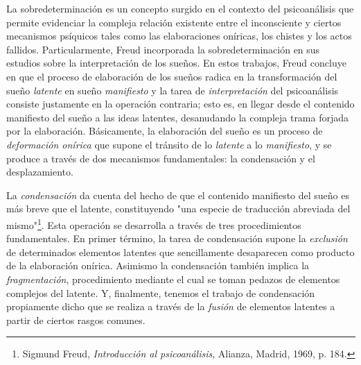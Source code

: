 \documentclass{book}
\begin{document}
La sobredeterminación es un concepto surgido en el contexto del
psicoanálisis que permite evidenciar la compleja relación existente
entre el inconsciente y ciertos mecanismos psíquicos tales como las
elaboraciones oníricas, los chistes y los actos fallidos.
Particularmente, Freud incorporada la sobredeterminación en sus estudios
sobre la interpretación de los sueños. En estos trabajos, Freud concluye
en que el proceso de elaboración de los sueños radica en la
transformación del sueño \emph{latente} en sueño \emph{manifiesto} y la
tarea de \emph{interpretación} del psicoanálisis consiste justamente en
la operación contraria; esto es, en llegar desde el contenido manifiesto
del sueño a las ideas latentes, desanudando la compleja trama forjada
por la elaboración. Básicamente, la elaboración del sueño es un proceso
de \emph{deformación onírica} que supone el tránsito de lo
\emph{latente} a lo \emph{manifiesto}, y se produce a través de dos
mecanismos fundamentales: la condensación y el desplazamiento.

La \emph{condensación} da cuenta del hecho de que el contenido
manifiesto del sueño es más breve que el latente, constituyendo "una
especie de traducción abreviada del mismo"\footnote{Sigmund Freud,
  \emph{Introducción al psicoanálisis}, Alianza, Madrid, 1969, p. 184.}.
Esta operación se desarrolla a través de tres procedimientos
fundamentales. En primer término, la tarea de condensación supone la
\emph{exclusión} de determinados elementos latentes que sencillamente
desaparecen como producto de la elaboración onírica. Asimismo la
condensación también implica la \emph{fragmentación}, procedimiento
mediante el cual se toman pedazos de elementos complejos del latente. Y,
finalmente, tenemos el trabajo de condensación propiamente dicho que se
realiza a través de la \emph{fusión} de elementos latentes a partir de
ciertos rasgos comunes.
\end{document}
